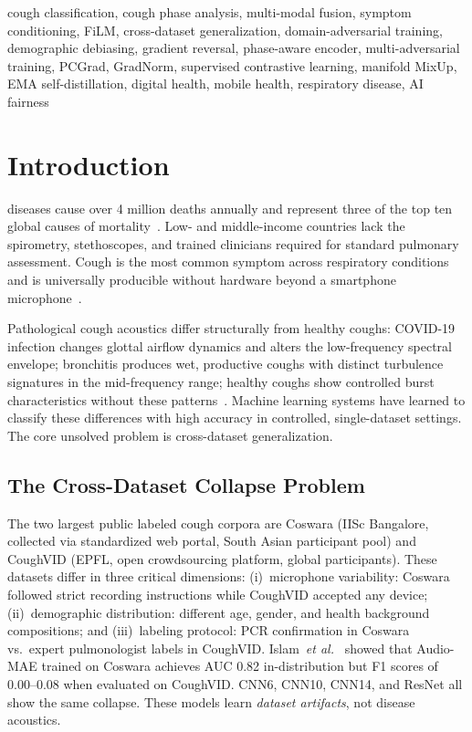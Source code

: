 \documentclass[journal]{IEEEtran}
\begin{document}
\begin{IEEEkeywords}
cough classification, cough phase analysis, multi-modal fusion,
symptom conditioning, FiLM, cross-dataset generalization,
domain-adversarial training, demographic debiasing, gradient reversal,
phase-aware encoder, multi-adversarial training, PCGrad, GradNorm,
supervised contrastive learning, manifold MixUp, EMA self-distillation,
digital health, mobile health, respiratory disease, AI fairness
\end{IEEEkeywords}

\section{Introduction}
\label{sec:intro}

 diseases cause over 4 million deaths
annually and represent three of the top ten global causes of
mortality~\cite{who2023}. Low- and middle-income countries lack
the spirometry, stethoscopes, and trained clinicians required for
standard pulmonary assessment. Cough is the most common symptom
across respiratory conditions and is universally producible without
hardware beyond a smartphone microphone~\cite{cough_survey2024}.

Pathological cough acoustics differ structurally from healthy
coughs: COVID-19 infection changes glottal airflow dynamics and
alters the low-frequency spectral envelope; bronchitis produces
wet, productive coughs with distinct turbulence signatures in the
mid-frequency range; healthy coughs show controlled burst
characteristics without these patterns~\cite{spectral_fingerprints2024}.
Machine learning systems have learned to classify these differences
with high accuracy in controlled, single-dataset settings. The core
unsolved problem is cross-dataset generalization.

\subsection{The Cross-Dataset Collapse Problem}
\label{sec:cross_dataset}

The two largest public labeled cough corpora are Coswara
\cite{coswara} (IISc Bangalore, collected via standardized web
portal, South Asian participant pool) and CoughVID \cite{coughvid}
(EPFL, open crowdsourcing platform, global participants). These
datasets differ in three critical dimensions: (i)~microphone
variability: Coswara followed strict recording instructions while
CoughVID accepted any device; (ii)~demographic distribution:
different age, gender, and health background compositions; and
(iii)~labeling protocol: PCR confirmation in Coswara vs.\ expert
pulmonologist labels in CoughVID. Islam~\textit{et al.}\
\cite{islam2025} showed that Audio-MAE trained on Coswara achieves
AUC 0.82 in-distribution but F1 scores of 0.00--0.08 when evaluated
on CoughVID. CNN6, CNN10, CNN14, and ResNet all show the same
collapse. These models learn \emph{dataset artifacts}, not disease
acoustics.
\end{document}
